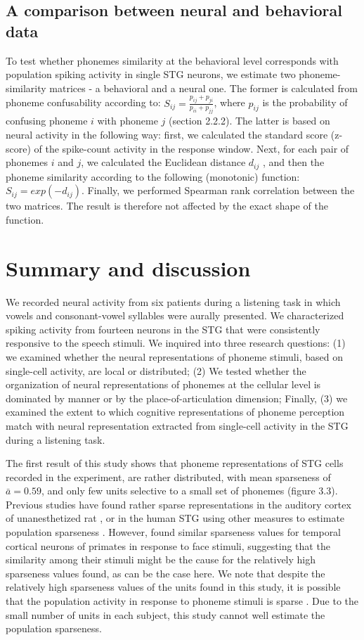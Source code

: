 \subsection{A comparison between neural and behavioral data}
To test whether phonemes similarity at the behavioral level corresponds with population spiking activity in single STG neurons, we estimate two phoneme-similarity matrices - a behavioral and a neural one. The former is calculated from phoneme confusability according to: $S_{ij}=\frac{p_{ij}+p_{ji}}{p_{ii}+p_{jj}}$, where $p_{ij}$ is the probability of confusing phoneme $i$ with phoneme $j$ (section 2.2.2). The latter is based on neural activity in the following way: first, we calculated the standard score (z-score) of the spike-count activity in the response window. Next, for each pair of phonemes $i$ and $j$, we calculated the Euclidean distance $d_{ij}$ \citep{khalighinejad2017dynamic}, and then the phoneme similarity according to the following (monotonic) function: $S_{ij}=exp(-d_{ij})$. Finally, we performed Spearman rank correlation between the two matrices. The result is therefore not affected by the exact shape of the function. 

\section{Summary and discussion}
We recorded neural activity from six patients during a listening task in which vowels and consonant-vowel syllables were aurally presented. We characterized spiking activity from fourteen neurons in the STG that were consistently responsive to the speech stimuli. We inquired into three research questions: (1) we examined whether the neural representations of phoneme stimuli, based on single-cell activity, are local or distributed; (2) We tested whether the organization of neural representations of phonemes at the cellular level is dominated by manner or by the place-of-articulation dimension; Finally, (3) we examined the extent to which cognitive representations of phoneme perception match with neural representation extracted from single-cell activity in the STG during a listening task.

The first result of this study shows that phoneme representations of STG cells recorded in the experiment, are rather distributed, with mean sparseness \citep{treves1991determines} of $\bar{a}=0.59$, and only few units selective to a small set of phonemes (figure 3.3). Previous studies have found rather sparse representations in the auditory cortex of unanesthetized rat \citep{hromadka2008sparse}, or in the human STG using other measures to estimate population sparseness \citep{chan2013speech}. However, \citet{rolls1995sparseness} found similar sparseness values for temporal cortical neurons of primates in response to face stimuli, suggesting that the similarity among their stimuli might be the cause for the relatively high sparseness values found, as can be the case here. We note that despite the relatively high sparseness values of the units found in this study, it is possible that the population activity in response to phoneme stimuli is sparse \citep{olshausen2004sparse}. Due to the small number of units in each subject, this study cannot well estimate the population sparseness.

